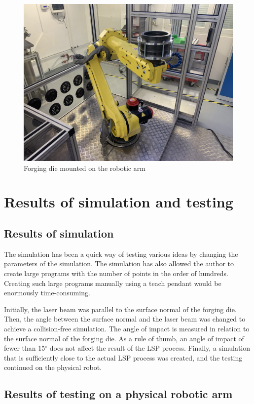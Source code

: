 \begin{figure}[h]
    \centering
    \includegraphics[width=0.9\linewidth]{img/cast.jpeg}
    \caption{Forging die mounted on the robotic arm}
    \label{fig:cast}
\end{figure}

\section{Results of simulation and testing}

\subsection{Results of simulation}

The simulation has been a quick way of testing various ideas by changing the parameters of the simulation. The simulation has also allowed the author to create large programs with the number of points in the order of hundreds. Creating such large programs manually using a teach pendant would be enormously time-consuming. 

Initially, the laser beam was parallel to the surface normal of the forging die. Then, the angle between the surface normal and the laser beam was changed to achieve a collision-free simulation. The angle of impact is measured in relation to the surface normal of the forging die. As a rule of thumb, an angle of impact of fewer than 15$^{\circ}$ does not affect the result of the LSP process.  Finally, a simulation that is sufficiently close to the actual LSP process was created, and the testing continued on the physical robot.

\subsection{Results of testing on a physical robotic arm}


